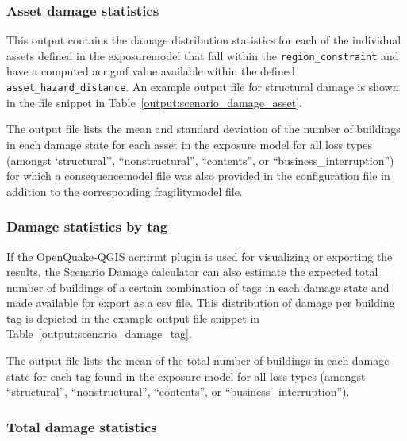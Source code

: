 \subsubsection{Asset damage statistics}
\label{subsubsec:scenario_asset_damage_statistics}

This output contains the damage distribution statistics for each of the
individual \glspl{asset} defined in the \gls{exposuremodel} that fall within
the \Verb+region_constraint+ and have a computed \gls{acr:gmf} value available
within the defined \Verb+asset_hazard_distance+. An example output file for
structural damage is shown in the file snippet in 
Table~\ref{output:scenario_damage_asset}.



The output file lists the mean and standard deviation of the number
of buildings in each damage state for each asset in the exposure model
for all loss types (amongst `structural'', ``nonstructural'', ``contents'', or
``business\_interruption'') for which a \gls{consequencemodel} file was also
provided in the configuration file in addition to the corresponding
\gls{fragilitymodel} file.


\subsubsection{Damage statistics by tag}
\label{subsubsec:scenario_tag_damage_statistics}

If the OpenQuake-QGIS \gls{acr:irmt} plugin is used for visualizing or
exporting the results, the Scenario Damage calculator can also estimate the
expected total number of buildings of a certain combination of \glspl{tag} in
each damage state and made available for export as a csv file. This
distribution of damage per building \gls{tag} is depicted in the example
output file snippet in Table~\ref{output:scenario_damage_tag}.



The output file lists the mean of the total number
of buildings in each damage state for each tag found in the
exposure model for all loss types (amongst
``structural'', ``nonstructural'', ``contents'', or
``business\_interruption'').


\subsubsection{Total damage statistics}
\label{subsubsec:scenario_total_damage_statistics}

